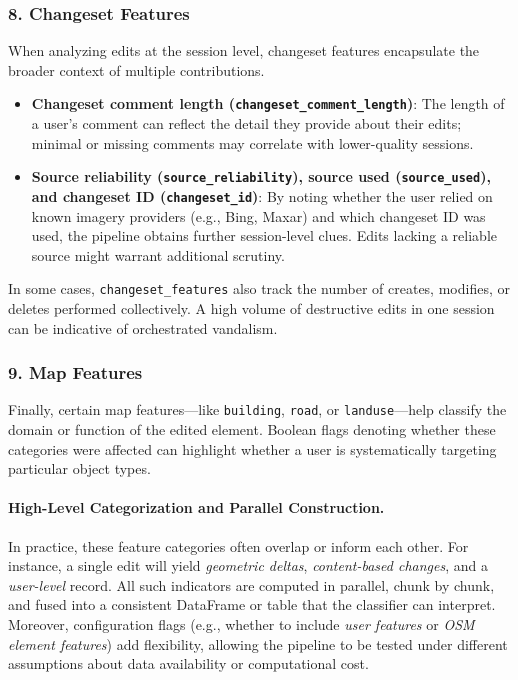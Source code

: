\documentclass[
    13pt, %
    a4paper, %
    twoside, 
    DIV14, %
    listof=totoc, %
    bibliography=totoc, %
    index=totoc, %
    headsepline
]{scrreprt}
\begin{document}
\subsubsection*{8. Changeset Features}
When analyzing edits at the session level, changeset features encapsulate the broader context of multiple contributions.

\begin{itemize}
  \item \textbf{Changeset comment length (\texttt{changeset\_comment\_length})}: The length of a user’s comment can reflect the detail they provide about their edits; minimal or missing comments may correlate with lower-quality sessions.
  \item \textbf{Source reliability (\texttt{source\_reliability}), source used (\texttt{source\_used}), and changeset ID (\texttt{changeset\_id})}: By noting whether the user relied on known imagery providers (e.g., Bing, Maxar) and which changeset ID was used, the pipeline obtains further session-level clues. Edits lacking a reliable source might warrant additional scrutiny.
\end{itemize}

In some cases, \texttt{changeset\_features} also track the number of creates, modifies, or deletes performed collectively. A high volume of destructive edits in one session can be indicative of orchestrated vandalism.

\subsubsection*{9. Map Features}
Finally, certain map features—like \texttt{building}, \texttt{road}, or \texttt{landuse}—help classify the domain or function of the edited element. Boolean flags denoting whether these categories were affected can highlight whether a user is systematically targeting particular object types.

\paragraph{High-Level Categorization and Parallel Construction.}
In practice, these feature categories often overlap or inform each other. For instance, a single edit will yield \emph{geometric deltas}, \emph{content-based changes}, and a \emph{user-level} record. All such indicators are computed in parallel, chunk by chunk, and fused into a consistent DataFrame or table that the classifier can interpret. Moreover, configuration flags (e.g., whether to include \emph{user features} or \emph{OSM element features}) add flexibility, allowing the pipeline to be tested under different assumptions about data availability or computational cost.
\end{document}
